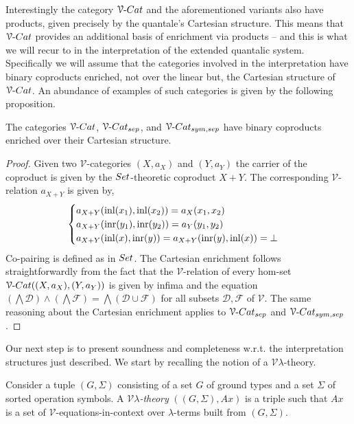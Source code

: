 \documentclass[a4paper,UKenglish,cleveref, autoref, thm-restate]{lipics-v2021}
\begin{document}
Interestingly the category $\VCat$ and the aforementioned variants also have
products, given precisely by the quantale's Cartesian structure. This means
that $\VCat$ provides an additional basis of enrichment via products -- and
this is what we will recur to in the interpretation of the extended quantalic
system.  Specifically we will assume that the categories involved in the
interpretation have binary coproducts enriched, not over the linear but, the
Cartesian structure of $\VCat$. An abundance of examples of such categories is
given by the following proposition.

\begin{proposition}
        The categories $\VCat$, $\VCatSe$, and $\VCatSS$   have binary
        coproducts enriched over their Cartesian structure.
\end{proposition}

\begin{proof}
        Given two $\mathcal{V}$-categories $(X,a_X)$ and $(Y,a_Y)$ the carrier
        of the coproduct is given by the $\catfont{Set}$-theoretic coproduct $X
        + Y$. The corresponding $\mathcal{V}$-relation $a_{X + Y}$ is given
        by,
        \[
                \begin{cases}
                        a_{X + Y}(\mathrm{inl}(x_1),\mathrm{inl}(x_2)) = a_X(x_1,x_2) \\
                        a_{X + Y}(\mathrm{inr}(y_1),\mathrm{inr}(y_2)) = a_Y(y_1,y_2) \\
                        a_{X + Y}(\mathrm{inl}(x), \mathrm{inr}(y)) = 
                        a_{X + Y}(\mathrm{inr}(y), \mathrm{inl}(x))  = \bot
                \end{cases}
        \]
        Co-pairing is defined as in $\catfont{Set}$. The Cartesian
        enrichment follows straightforwardly from the fact that the
        $\mathcal{V}$-relation of every hom-set $\VCat((X,a_X),(Y,a_Y))$ is
        given by infima and the equation $(\bigwedge \mathscr{D}) \wedge
        (\bigwedge \mathscr{F}) = \bigwedge (\mathscr{D} \cup \mathscr{F})$ for
        all subsets $\mathscr{D},\mathscr{F}$ of $\mathcal{V}$.  The same
        reasoning about the Cartesian enrichment applies to $\VCatSe$ and
        $\VCatSS$.
\end{proof}

Our next step is to present soundness and completeness w.r.t.  the
interpretation structures just described. We start by recalling the notion of a
$\mathcal{V}\lambda$-theory.

\begin{definition}\label{defn:theory}
  Consider a tuple $(G,\Sigma)$ consisting of a set $G$ of ground types and a
  set $\Sigma$ of sorted operation symbols.  A \emph{$\mathcal{V}
  \lambda$-theory} $((G,\Sigma),Ax)$ is a triple such that $Ax$ is a set of
  $\mathcal{V}$-equations-in-context over $\lambda$-terms built from
  $(G,\Sigma)$.
\end{definition}
\end{document}
